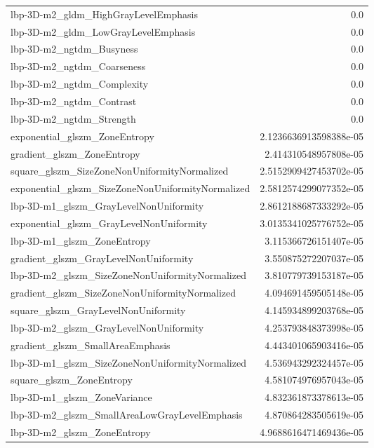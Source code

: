 {\begin{xltabular}[H]{\textwidth}{X r}
        lbp-3D-m2\_gldm\_HighGrayLevelEmphasis & 0.0 \\
        lbp-3D-m2\_gldm\_LowGrayLevelEmphasis & 0.0 \\
        lbp-3D-m2\_ngtdm\_Busyness & 0.0 \\
        lbp-3D-m2\_ngtdm\_Coarseness & 0.0 \\
        lbp-3D-m2\_ngtdm\_Complexity & 0.0 \\
        lbp-3D-m2\_ngtdm\_Contrast & 0.0 \\
        lbp-3D-m2\_ngtdm\_Strength & 0.0 \\
        exponential\_glszm\_ZoneEntropy & 2.1236636913598388e-05 \\
        gradient\_glszm\_ZoneEntropy & 2.414310548957808e-05 \\
        square\_glszm\_SizeZoneNonUniformityNormalized & 2.5152909427453702e-05 \\
        exponential\_glszm\_SizeZoneNonUniformityNormalized & 2.5812574299077352e-05 \\
        lbp-3D-m1\_glszm\_GrayLevelNonUniformity & 2.8612188687333292e-05 \\
        exponential\_glszm\_GrayLevelNonUniformity & 3.0135341025776752e-05 \\
        lbp-3D-m1\_glszm\_ZoneEntropy & 3.115366726151407e-05 \\
        gradient\_glszm\_GrayLevelNonUniformity & 3.550875272207037e-05 \\
        lbp-3D-m2\_glszm\_SizeZoneNonUniformityNormalized & 3.810779739153187e-05 \\
        gradient\_glszm\_SizeZoneNonUniformityNormalized & 4.094691459505148e-05 \\
        square\_glszm\_GrayLevelNonUniformity & 4.145934899203768e-05 \\
        lbp-3D-m2\_glszm\_GrayLevelNonUniformity & 4.253793848373998e-05 \\
        gradient\_glszm\_SmallAreaEmphasis & 4.443401065903416e-05 \\
        lbp-3D-m1\_glszm\_SizeZoneNonUniformityNormalized & 4.536943292324457e-05 \\
        square\_glszm\_ZoneEntropy & 4.581074976957043e-05 \\
        lbp-3D-m1\_glszm\_ZoneVariance & 4.832361873378613e-05 \\
        lbp-3D-m2\_glszm\_SmallAreaLowGrayLevelEmphasis & 4.870864283505619e-05 \\
        lbp-3D-m2\_glszm\_ZoneEntropy & 4.9688616471469436e-05 \\

\end{xltabular}}

